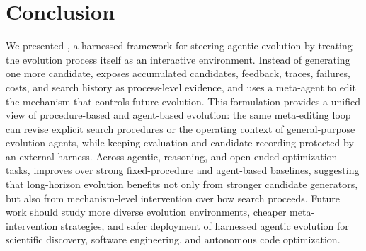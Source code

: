 \section{Conclusion}

We presented \method, a harnessed framework for steering agentic evolution by treating the evolution process itself as an interactive environment. Instead of generating one more candidate, \method exposes accumulated candidates, feedback, traces, failures, costs, and search history as process-level evidence, and uses a meta-agent to edit the mechanism that controls future evolution. This formulation provides a unified view of procedure-based and agent-based evolution: the same meta-editing loop can revise explicit search procedures or the operating context of general-purpose evolution agents, while keeping evaluation and candidate recording protected by an external harness. Across agentic, reasoning, and open-ended optimization tasks, \method improves over strong fixed-procedure and agent-based baselines, suggesting that long-horizon evolution benefits not only from stronger candidate generators, but also from mechanism-level intervention over how search proceeds. Future work should study more diverse evolution environments, cheaper meta-intervention strategies, and safer deployment of harnessed agentic evolution for scientific discovery, software engineering, and autonomous code optimization.